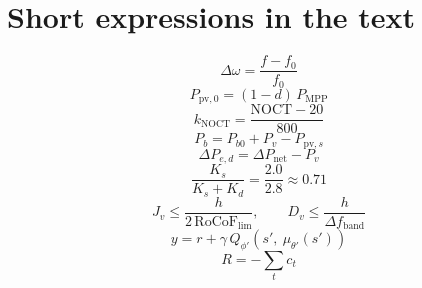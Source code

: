 \documentclass[11pt]{article}
\begin{document}
\section*{Short expressions in the text}
\[
\Delta\omega = \frac{f - f_0}{f_0}
\]
\[
P_{\mathrm{pv},0} = (1 - d)\,P_{\mathrm{MPP}}
\]
\[
k_{\mathrm{NOCT}} = \frac{\mathrm{NOCT} - 20}{800}
\]
\[
P_b = P_{b0} + P_v - P_{\mathrm{pv},s}
\]
\[
\Delta P_{e,d} = \Delta P_{\mathrm{net}} - P_v
\]
\[
\frac{K_s}{K_s + K_d} = \frac{2.0}{2.8} \approx 0.71
\]
\[
J_v \le \frac{h}{2\,\mathrm{RoCoF}_{\mathrm{lim}}}, \qquad D_v \le \frac{h}{\Delta f_{\mathrm{band}}}
\]
\[
y = r + \gamma\,Q_{\phi'}\!\left(s',\ \mu_{\theta'}(s')\right)
\]
\[
R = -\sum_t c_t
\]
\end{document}
